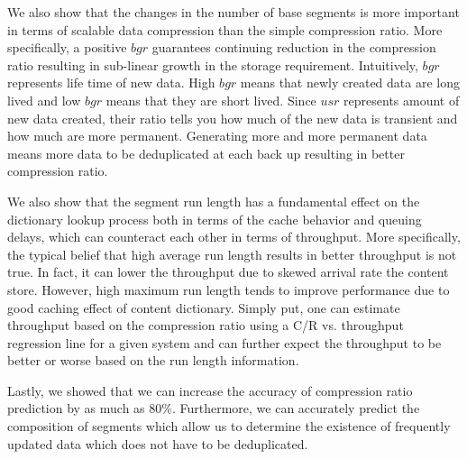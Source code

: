 We also show that the changes in the number of base segments is more important in terms of scalable data compression than the simple compression ratio. More specifically, a positive $bgr$ guarantees continuing reduction in the compression ratio resulting in sub-linear growth in the storage requirement. Intuitively, $bgr$ represents life time of new data. High $bgr$ means that newly created data are long lived and low $bgr$ means that they are short lived. Since $usr$ represents amount of new data created, their ratio tells you how much of the new data is transient and how much are more permanent. Generating more and more permanent data means more data to be deduplicated at each back up resulting in better compression ratio.  

We also show that the segment run length has a fundamental effect on the dictionary lookup process both in terms of the cache behavior and queuing delays, which can counteract each other in terms of throughput. More specifically, the typical belief that high average run length results in better throughput is not true. In fact, it can lower the throughput due to skewed arrival rate the content store. However, high maximum run length tends to improve performance due to good caching effect of content dictionary. Simply put, one can estimate throughput based on the compression ratio using a C/R vs. throughput regression line for a given system and can further expect the throughput to be better or worse based on the run length information.

Lastly, we showed that we can increase the accuracy of compression ratio prediction by as much as 80\%. Furthermore, we can accurately predict the composition of segments which allow us to determine the existence of frequently updated data which does not have to be deduplicated. 

